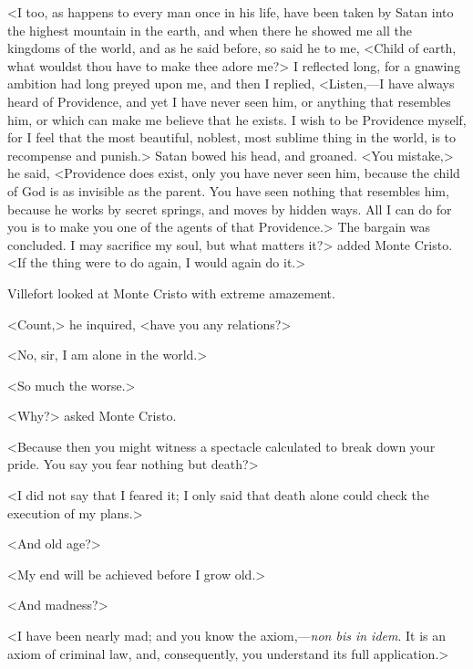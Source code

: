  <I too, as happens to every man once in his life, have been taken by Satan into the highest mountain in the earth, and when there he showed me all the kingdoms of the world, and as he said before, so said he to me, <Child of earth, what wouldst thou have to make thee adore me?> I reflected long, for a gnawing ambition had long preyed upon me, and then I replied, <Listen,—I have always heard of Providence, and yet I have never seen him, or anything that resembles him, or which can make me believe that he exists. I wish to be Providence myself, for I feel that the most beautiful, noblest, most sublime thing in the world, is to recompense and punish.> Satan bowed his head, and groaned. <You mistake,> he said, <Providence does exist, only you have never seen him, because the child of God is as invisible as the parent. You have seen nothing that resembles him, because he works by secret springs, and moves by hidden ways. All I can do for you is to make you one of the agents of that Providence.> The bargain was concluded. I may sacrifice my soul, but what matters it?> added Monte Cristo. <If the thing were to do again, I would again do it.> 

 Villefort looked at Monte Cristo with extreme amazement. 

 <Count,> he inquired, <have you any relations?> 

 <No, sir, I am alone in the world.> 

 <So much the worse.> 

 <Why?> asked Monte Cristo. 

 <Because then you might witness a spectacle calculated to break down your pride. You say you fear nothing but death?> 

 <I did not say that I feared it; I only said that death alone could check the execution of my plans.> 

 <And old age?> 

 <My end will be achieved before I grow old.> 

 <And madness?> 

 <I have been nearly mad; and you know the axiom,—\textit{non bis in idem}. It is an axiom of criminal law, and, consequently, you understand its full application.>  
 
